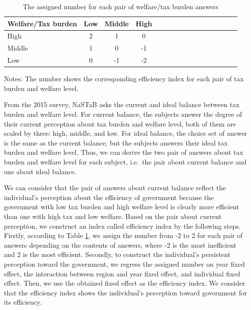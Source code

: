 \documentclass[ review  , 3p ]{elsarticle}
\begin{document}
  \begin{table}

  \caption{\label{tab:efficientQ}The assigned number for each pair of welfare/tax burden answers}
  \centering
  \fontsize{8}{10}\selectfont
  \begin{threeparttable}
  \begin{tabular}[t]{l|cccl|cccl|cccl|ccc}
  \toprule
  Welfare/Tax burden & Low & Middle & High\\
  \midrule
  High & 2 & 1 & 0\\
  Middle & 1 & 0 & -1\\
  Low & 0 & -1 & -2\\
  \bottomrule
  \end{tabular}
  \begin{tablenotes}
  \item Notes: The number shows the corresponding efficiency index for each pair of tax burden and welfare level.
  \end{tablenotes}
  \end{threeparttable}
  \end{table}

  From the 2015 survey, NaSTaB asks the current and ideal balance between tax burden and welfare level.
  For current balance, the subjects answer the degree of their current perception about tax burden and welfare level,
  both of them are scaled by three: high, middle, and low.
  For ideal balance, the choice set of answer is the same as the current balance, but the subjects answers their ideal tax burden and welfare level.
  Thus, we can derive the two pair of answers about tax burden and welfare level for each subject, i.e.~the pair about current balance and one about ideal balance.

  We can consider that the pair of answers about current balance reflect the individual's perception about the efficiency of government
  because the government with low tax burden and high welfare level is clearly more efficient than one with high tax and low welfare.
  Based on the pair about current perception, we construct an index called efficiency index by the following steps.
  Firstly, according to Table \ref{tab:efficientQ},
  we assign the number from -2 to 2 for each pair of answers depending on the contents of answers,
  where -2 is the most inefficient and 2 is the most efficient.
  Secondly, to construct the individual's persistent perception toward the government,
  we regress the assigned number on year fixed effect, the interaction between region and year fixed effect, and individual fixed effect.
  Then, we use the obtained fixed effect as the efficiency index.
  We consider that the efficiency index shows the individual's perception toward government for its efficiency.
\end{document}
